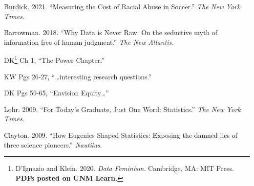 \item Burdick. 2021. “Measuring the Cost of Racial Abuse in Soccer.'' \textit{The New York Times.} 
    
\item Barrowman. 2018. ``Why Data is Never Raw: On the seductive myth of information free of human judgment.'' \textit{The New Atlantis}.

\item DK\footnote{D'Ignazio and Klein. 2020. \textit{Data Feminism.} Cambridge, MA: MIT Press. \textbf{PDFs posted on UNM Learn.}} Ch 1, ``The Power Chapter.''


    \item KW Pgs 26-27, ``\dots interesting research questions.''
    \item DK Pgs 59-65, ``Envision Equity\dots''
    
    
    \item Lohr. 2009. ``For Today’s Graduate, Just One Word: Statistics.''\textit{ The New York Times}. 
    \item Clayton. 2009. ``How Eugenics Shaped Statistics: Exposing the damned lies of three science pioneers.'' \textit{Nautilus}.